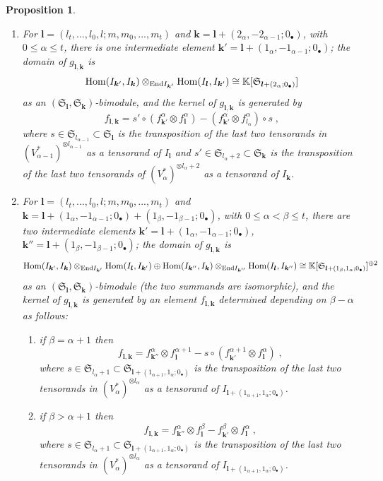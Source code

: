 \documentclass[12pt]{article}
\def\KK {{\mathbb K}}     %
\def\mk {\mathfrak}
\newtheorem{prop}[theorem]{Proposition}
\begin{document}
\begin{prop}
\begin{enumerate}
$$$$
as an $(\mk S_{\bm l},\mk S_{\bm k})$-bimodule (the two summands are isomorphic), and the kernel of $g_{\bm l,\bm k}$ is generated by
$$
f_{\bm l,\bm k}= f^{\alpha}_{\bm k''}\otimes \bar f^{\beta}_{\bm l} - \bar f^{\beta}_{\bm k'}\otimes f^{\alpha}_{\bm l} \;.
$$
\item For $\bm l=(l_t,...,l_0,l;m,m_0,...,m_t)$ and $\bm k=\bm l+(2_{\alpha},-2_{\alpha-1};0_\bullet)$, with $0\leq\alpha\leq t$, there is one intermediate element $\bm k'=\bm l+(1_{\alpha},-1_{\alpha-1};0_\bullet)$; the domain of $g_{\bm l,\bm k}$ is
$$
{\rm Hom}(I_{\bm k'},I_{\bm k})\otimes_{{\rm End}I_{\bm k'}}{\rm Hom}(I_{\bm l},I_{\bm k'}) \cong \KK[\mk S_{\bm l+(2_{\alpha};0_\bullet)}]
$$
as an $(\mk S_{\bm l},\mk S_{\bm k})$-bimodule, and the kernel of $g_{\bm l,\bm k}$ is generated by
$$
f_{\bm l,\bm k}= s' \circ (f^{\alpha}_{\bm k'}\otimes f^{\alpha}_{\bm l}) - (f^{\alpha}_{\bm k'}\otimes f^{\alpha}_{l_{\alpha}}) \circ s \;,
$$
where $s\in \mk S_{l_{\alpha-1}}\subset \mk S_{\bm l}$ is the transposition of the last two tensorands in $(V^*_{\alpha-1})^{\otimes l_{\alpha-1}}$ as a tensorand of $I_{\bm l}$ and $s'\in \mk S_{l_{\alpha}+2}\subset\mk S_{\bm k}$ is the transposition of the last two tensorands of $(V^*_{\alpha})^{\otimes l_{\alpha}+2}$ as a tensorand of $I_{\bm k}$.
\item For $\bm l=(l_t,...,l_0,l;m,m_0,...,m_t)$ and $\bm k=\bm l+(1_{\alpha},-1_{\alpha-1};0_\bullet)+(1_{\beta},-1_{\beta-1};0_\bullet)$, with $0\leq\alpha<\beta\leq t$, there are two intermediate elements $\bm k'=\bm l+(1_{\alpha},-1_{\alpha-1};0_\bullet)$, $\bm k''=\bm l+(1_{\beta},-1_{\beta-1};0_\bullet)$; the domain of $g_{\bm l,\bm k}$ is
$$
{\rm Hom}(I_{\bm k'},I_{\bm k})\otimes_{{\rm End}I_{\bm k'}}{\rm Hom}(I_{\bm l},I_{\bm k'})\oplus {\rm Hom}(I_{\bm k''},I_{\bm k})\otimes_{{\rm End}I_{\bm k''}}{\rm Hom}(I_{\bm l},I_{\bm k''}) \cong \KK[\mk S_{\bm l+(1_{\beta},1_\alpha;0_\bullet)}]^{\oplus 2}
$$
as an $(\mk S_{\bm l},\mk S_{\bm k})$-bimodule (the two summands are isomorphic), and the kernel of $g_{\bm l,\bm k}$ is generated by an element $f_{\bm l,\bm k}$ determined depending on $\beta-\alpha$ as follows:
\begin{enumerate}
\item if $\beta=\alpha+1$ then 
$$
f_{\bm l,\bm k}= f^{\alpha}_{\bm k''}\otimes f^{\alpha+1}_{\bm l} - s\circ (f^{\alpha+1}_{\bm k'}\otimes f^{\alpha}_{\bm l}) \;,
$$
where $s\in \mk S_{l_{\alpha}+1}\subset \mk S_{\bm l+(1_{\alpha+1},1_\alpha;0_\bullet)}$ is the transposition of the last two tensorands in $(V^*_{\alpha})^{\otimes l_{\alpha}}$ as a tensorand of $I_{\bm l+(1_{\alpha+1},1_\alpha;0_\bullet)}$.
\item if $\beta>\alpha+1$ then 
$$
f_{\bm l,\bm k}= f^{\alpha}_{\bm k''}\otimes f^{\beta}_{\bm l} - f^{\beta}_{\bm k'}\otimes f^{\alpha}_{\bm l} \;,
$$
where $s\in \mk S_{l_{\alpha}+1}\subset \mk S_{\bm l+(1_{\alpha+1},1_\alpha;0_\bullet)}$ is the transposition of the last two tensorands in $(V^*_{\alpha})^{\otimes l_{\alpha}}$ as a tensorand of $I_{\bm l+(1_{\alpha+1},1_\alpha;0_\bullet)}$.
\end{enumerate}
\end{enumerate}
\end{prop}
\end{document}

